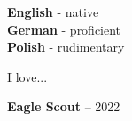 \documentclass[9pt]{developercv} %
\begin{document}
\begin{minipage}[t]{0.3\textwidth}
	\vspace{-\baselineskip} %

	
	\textbf{English} - native\\
	\textbf{German} - proficient\\
	\textbf{Polish} - rudimentary
\end{minipage}
\hfill
\begin{minipage}[t]{0.3\textwidth}
	\vspace{-\baselineskip} %
	
	
	I love... \lorem
\end{minipage}
\hfill
\begin{minipage}[t]{0.3\textwidth}
	\vspace{-\baselineskip} %
	
	
	\textbf{Eagle Scout} -- 2022\\
\end{minipage}

\vspace{\baselineskip}

\end{document}
